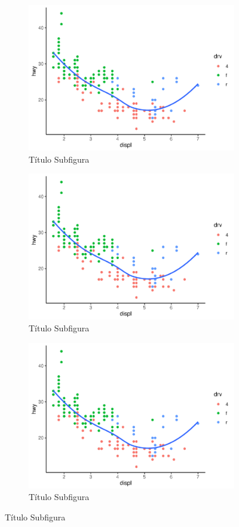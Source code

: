 \begin{figure}[h]
	\caption{Quadro de Figuras}
	\begin{subfigure}[h]{0.5\textwidth}
		\caption{Título Subfigura}
		\includegraphics[width=\linewidth]{fig/plot2}
	\end{subfigure}
	\begin{subfigure}[h]{0.5\textwidth}
		\caption{Título Subfigura}
		\includegraphics[width=\linewidth]{fig/plot2}
	\end{subfigure}
	\begin{subfigure}[h]{0.5\textwidth}
		\caption{Título Subfigura}
		\includegraphics[width=\linewidth]{fig/plot2}

\end{subfigure}
\end{figure}
